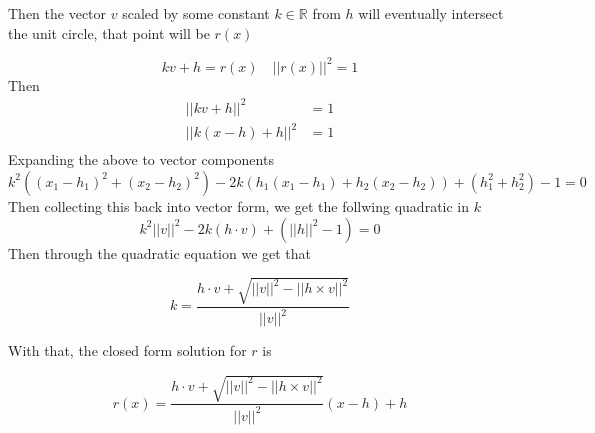 \documentclass{article} %
\begin{document}
Then the vector $v$ scaled by some constant $k \in \mathbb{R}$ from
$h$ will eventually intersect the unit circle, that point will be $r(x)$

\[
  kv + h = r(x) \quad ||r(x)||^2 = 1
\]
Then
\begin{align*}
  ||kv + h||^2 &= 1 \\
  ||k(x-h) + h||^2 &= 1 \\
\end{align*}
Expanding the above to vector components
\[
  k^2((x_1 - h_1)^2 + (x_2 - h_2)^2)  -  2k(h_1(x_1-h_1) + h_2(x_2 -
  h_2)) + (h_1^2 + h_2^2)-1= 0
\]
Then collecting this back into vector form, we get the follwing quadratic in $k$
\[
  k^2||v||^2 - 2k(h\cdot v) + (||h||^2 - 1) = 0
\]
Then through the quadratic equation we get that

\[
  k = \frac{h\cdot v + \sqrt{||v||^2 - ||h \times v||^2}}{||v||^2}
\]

With that, the closed form solution for $r$ is

$$
r(x) =  \frac{h\cdot v + \sqrt{||v||^2 - ||h \times v||^2}}{||v||^2} (x - h) + h
$$
\end{document}
